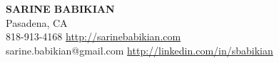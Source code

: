 \documentclass[11pt]{res-modified}
\begin{document}
 
\sloppy
\thispagestyle{empty} %

 \textbf{\Large SARINE BABIKIAN}\\
Pasadena, CA\\
818-913-4168  \hfill \url{ http://sarinebabikian.com}\\
sarine.babikian@gmail.com \hfill \url{ http://linkedin.com/in/sbabikian}\\
\end{document}
